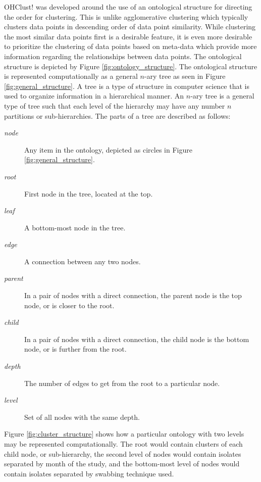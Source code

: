 \documentclass[12pt]{ucthesis}
\begin{document}
      \textsf{OHClust!} was developed around the use of an ontological
      structure for directing the order for clustering. This is unlike
      \textsf{agglomerative clustering} which typically clusters data points in
      descending order of data point similarity. While clustering the most
      similar data points first is a desirable feature, it is even more
      desirable to prioritize the clustering of data points based on meta-data
      which provide more information regarding the relationships between data
      points. The ontological structure is depicted by Figure
      \ref{fig:ontology_structure}. The ontological structure is represented
      computationally as a general $n$-ary tree as seen in Figure
      \ref{fig:general_structure}. A tree is a type of structure in computer
      science that is used to organize information in a hierarchical manner. An
      $n$-ary tree is a general type of tree such that each level of the
      hierarchy may have any number $n$ partitions or sub-hierarchies. The
      parts of a tree are described as follows:
      \begin{description}
         \item[\em{node}] Any item in the ontology, depicted as circles in Figure
                          \ref{fig:general_structure}.
         \item[\em{root}] First node in the tree, located at the top.
         \item[\em{leaf}] A bottom-most node in the tree.
         \item[\em{edge}] A connection between any two nodes.
         \item[\em{parent}] In a pair of nodes with a direct connection, the
                            parent node is the top node, or is closer to the
                            root.
         \item[\em{child}] In a pair of nodes with a direct connection, the child
                           node is the bottom node, or is further from the root.
         \item[\em{depth}] The number of edges to get from the root to a
                           particular node.
         \item[\em{level}] Set of all nodes with the same depth.
      \end{description}
      Figure \ref{fig:cluster_structure} shows how a particular ontology with two
      levels may be represented computationally. The root would contain clusters
      of each child node, or sub-hierarchy, the second level of nodes would
      contain isolates separated by month of the study, and the bottom-most level
      of nodes would contain isolates separated by swabbing technique used.
\end{document}
